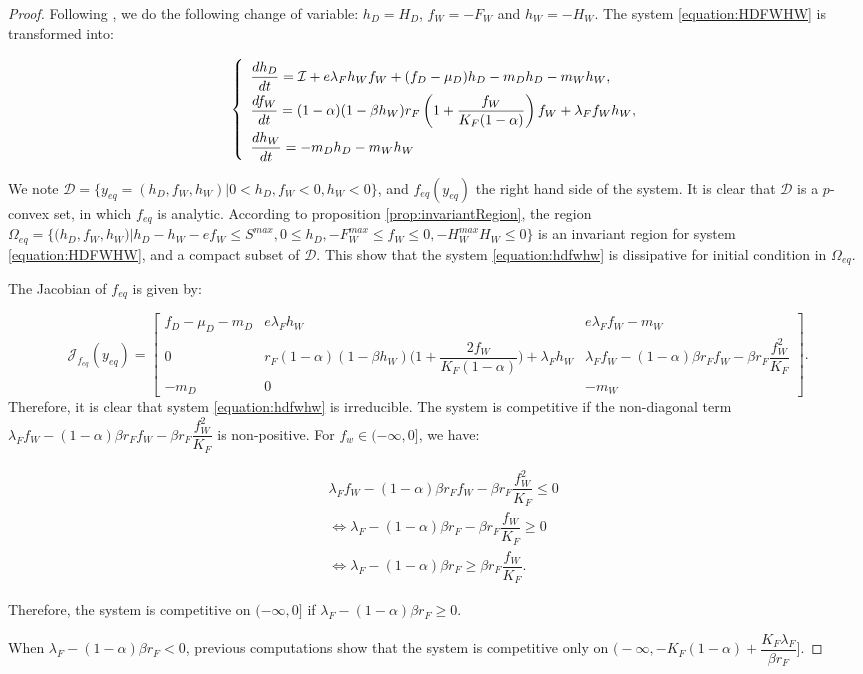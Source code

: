 \documentclass{article}
\newcommand{\lfw}{\lambda_{F}}
\newcommand{\lfw}{\lambda_{F}}
\newcommand{\cI}{\mathcal{I}}
\begin{document}
\begin{proof}
Following \cite{wang_predator-prey_1997}, we do the following change of variable: $h_D =  H_D$, $f_W = -F_W$ and $h_W = -H_W$. The system \eqref{equation:HDFWHW} is transformed into:

\begin{equation}
\def\arraystretch{2}
\left\{ \begin{array}{l}
\dfrac{dh_D}{dt}= \cI + e\lfw h_W f_W + (f_D - \mu_D) h_D - m_D h_D - m_W h_W, \\
\dfrac{df_W}{dt} = (1-\alpha)(1 - \beta h_W) r_F \left(1 + \dfrac{f_W}{K_F(1-\alpha)} \right) f_W + \lfw f_W h_W, \\
\dfrac{dh_W}{dt}= -m_D h_D - m_W h_W 
\end{array} \right.
\end{equation}

We note $\mathcal{D} = \Big\{y_{eq} = (h_D, f_W, h_W) | 0 < h_D, f_W < 0, h_W < 0 \Big\}$, and $f_{eq}(y_{eq})$ the right hand side of the system. It is clear that $\mathcal{D}$ is a $p$-convex set, in which $f_{eq}$ is analytic. According to proposition \ref{prop:invariantRegion}, the region $\Omega_{eq} 
 = \Big\{\Big(h_D, f_W, h_W \Big)  \Big|h_D -h_W - ef_W \leq S^{max}, 0 \leq h_D,  -F_W^{max} \leq f_W \leq 0, -H_W^{max}H_W \leq 0 \Big\}
 $ is an invariant region for system \eqref{equation:HDFWHW}, and a compact subset of $\mathcal{D}$. This show that the system \eqref{equation:hdfwhw} is dissipative for initial condition in  $\Omega_{eq}$.

The Jacobian of $f_{eq}$ is given by:

\begin{equation*}
\mathcal{J}_{f_{eq}}(y_{eq}) = \begin{bmatrix}
f_D -\mu_D - m_D & e \lfw h_W & e \lfw f_W - m_W \\
0 & r_F (1-\alpha)(1-\beta h_W) \Big(1 + \dfrac{2 f_W}{K_F(1-\alpha)}\Big) + \lfw  h_W & \lfw f_W - (1-\alpha)\beta r_F f_W - \beta r_F \dfrac{f_W^2}{K_F}\\
-m_D & 0 & -m_W
\end{bmatrix}.
\end{equation*}
Therefore, it is clear that system \eqref{equation:hdfwhw} is irreducible. The system is competitive if the non-diagonal term $\lfw f_W - (1-\alpha)\beta r_F f_W - \beta r_F \dfrac{f_W^2}{K_F}$ is non-positive. For $f_w \in (-\infty, 0]$, we have:

\begin{align*}
&\lfw f_W - (1-\alpha)\beta r_F f_W - \beta r_F \dfrac{f_W^2}{K_F} \leq 0 \\
&\Leftrightarrow \lfw - (1-\alpha)\beta r_F - \beta r_F \dfrac{f_W}{K_F} \geq 0 \\
&\Leftrightarrow \lfw - (1-\alpha)\beta r_F \geq \beta r_F \dfrac{f_W}{K_F}.
\end{align*}

Therefore, the system is competitive on $(-\infty, 0]$ if $\lfw - (1-\alpha)\beta r_F \geq 0$. 

When $\lfw - (1-\alpha)\beta r_F<0$, previous computations show that the system is competitive only on $\Big(-\infty, -K_F(1-\alpha) + \dfrac{K_F \lfw}{\beta r_F}\Big]$. 
\end{proof}
\end{document}
